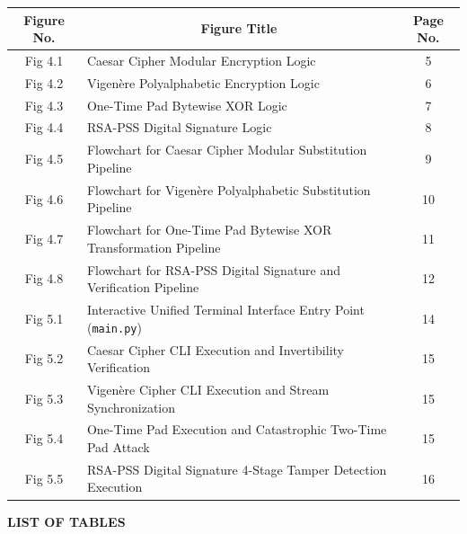 \documentclass[12pt,a4paper]{report}
\begin{document}
\begin{table}[h!]
\centering
\fontsize{9.5}{12}\selectfont
\begin{tabular}{|c|p{4.8in}|c|}
\hline
\rowcolor{tableheader}
\textbf{Figure No.} & \multicolumn{1}{c|}{\textbf{Figure Title}} & \textbf{Page No.} \\
\hline
Fig 4.1 & Caesar Cipher Modular Encryption Logic & 5 \\
\hline
Fig 4.2 & Vigen\`ere Polyalphabetic Encryption Logic & 6 \\
\hline
Fig 4.3 & One-Time Pad Bytewise XOR Logic & 7 \\
\hline
Fig 4.4 & RSA-PSS Digital Signature Logic & 8 \\
\hline
Fig 4.5 & Flowchart for Caesar Cipher Modular Substitution Pipeline & 9 \\
\hline
Fig 4.6 & Flowchart for Vigen\`ere Polyalphabetic Substitution Pipeline & 10 \\
\hline
Fig 4.7 & Flowchart for One-Time Pad Bytewise XOR Transformation Pipeline & 11 \\
\hline
Fig 4.8 & Flowchart for RSA-PSS Digital Signature and Verification Pipeline & 12 \\
\hline
Fig 5.1 & Interactive Unified Terminal Interface Entry Point (\texttt{main.py}) & 14 \\
\hline
Fig 5.2 & Caesar Cipher CLI Execution and Invertibility Verification & 15 \\
\hline
Fig 5.3 & Vigen\`ere Cipher CLI Execution and Stream Synchronization & 15 \\
\hline
Fig 5.4 & One-Time Pad Execution and Catastrophic Two-Time Pad Attack & 15 \\
\hline
Fig 5.5 & RSA-PSS Digital Signature 4-Stage Tamper Detection Execution & 16 \\
\hline
\end{tabular}
\end{table}

\vspace{1.5em}

\begin{center}
    {\fontsize{14}{16}\bfseries LIST OF TABLES}\\[1.5em]
\end{center}
\end{document}
